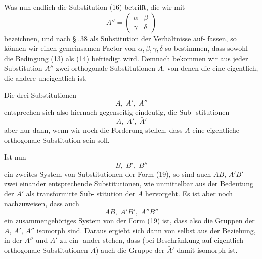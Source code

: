 \documentclass[12pt,a4paper]{article}
\theoremstyle{plain}
\theoremstyle{definition}
\theoremstyle{remark}
\begin{document}
Was nun endlich die Substitution (16) betrifft, die wir mit
\begin{equation}\label{eq:49_18}
A'' = \begin{pmatrix}\alpha & \beta\\ \gamma & \delta\end{pmatrix}\tag{18}
\end{equation}
bezeichnen, und nach \S\,.\,38 als Substitution der Verh\"altnisse auf-
fassen, so k\"onnen wir einen gemeinsamen Factor von $\alpha, \beta, \gamma, \delta$
so bestimmen, dass sowohl die Bedingung (13) als (14) befriedigt
wird. Demnach bekommen wir aus jeder Substitution $A''$ zwei
orthogonale Substitutionen $A$, von denen die eine eigentlich, die
andere uneigentlich ist.

Die drei Substitutionen
\begin{equation}\label{eq:49_19}
A,\; A',\; A''\tag{19}
\end{equation}
entsprechen sich also hiernach gegenseitig eindeutig, die Sub-
stitutionen
\begin{equation}\label{eq:49_20}
A,\; A',\; \bar{A}'\tag{20}
\end{equation}
aber nur dann, wenn wir noch die Forderung stellen, dass $A$
eine eigentliche orthogonale Substitution sein soll.

Ist nun
\begin{equation}\label{eq:49_21}
B,\; B',\; B''\tag{21}
\end{equation}
ein zweites System von Substitutionen der Form (19), so sind
auch $AB$, $A'B'$ zwei einander entsprechende Substitutionen, wie
unmittelbar aus der Bedeutung der $A'$ als transformirte Sub-
stitution der $A$ hervorgeht. Es ist aber noch nachzuweisen,
dass auch
\begin{equation}\label{eq:49_22}
AB,\; A'B',\; A''B''\tag{22}
\end{equation}
ein zusammengeh\"origes System von der Form (19) ist, dass also
die Gruppen der $A$, $A'$, $A''$ isomorph sind. Daraus ergiebt sich
dann von selbst aus der Beziehung, in der $A''$ und $\bar{A}'$ zu ein-
ander stehen, dass (bei Beschr\"ankung auf eigentlich orthogonale
Substitutionen $A$) auch die Gruppe der $\bar{A}'$ damit isomorph ist.
\end{document}
